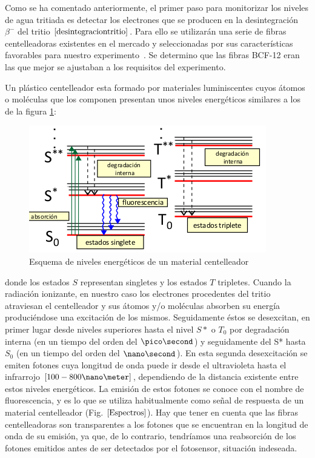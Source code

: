 Como se ha comentado anteriormente, el primer paso para monitorizar los niveles de agua tritiada es detectar los electrones que se producen en la desintegración $\beta^-$ del tritio $\eqref{desintegraciontritio}$. Para ello se utilizarán una serie de fibras centelleadoras existentes en el mercado y seleccionadas por sus características favorables para nuestro experimento~\cite{Alberto}.  Se determino que las fibras BCF-12 eran las que mejor se ajustaban a los requisitos del experimento. 

Un plástico centelleador esta formado por materiales luminiscentes cuyos átomos o moléculas que los componen presentan unos niveles energéticos similares a los de la figura \ref{Esquemafibras}:

\begin{figure}[hbtp]
\centering
\includegraphics[scale=0.7]{EsquemaNivelesFIbras.png}
\caption{Esquema de niveles energéticos de un material centelleador~\cite{asignatura}\label{Esquemafibras}
}
\end{figure}
donde los estados $S$ representan singletes y los estados $T$ tripletes. Cuando la radiación ionizante, en nuestro caso los electrones procedentes del tritio  atraviesan el centelleador  y sus átomos y/o moléculas absorben su energía produciéndose una excitación de los mismos. 
Seguidamente éstos se desexcitan, en primer lugar desde niveles superiores hasta el nivel $S*$ o $T_0$ por degradación interna (en un tiempo del orden del $\pico\second$) y seguidamente del S* hasta $S_0$ (en un tiempo del orden del $\nano\second$). En esta segunda desexcitación se emiten fotones cuya longitud de onda puede ir desde el ultravioleta hasta el infrarrojo $[100-800 \nano\meter]$, dependiendo de la distancia existente entre estos niveles energéticos. La emisión de estos fotones se conoce con el nombre de  fluorescencia, y es lo que se utiliza habitualmente como señal de respuesta de un material centelleador (Fig. $\ref{Espectros}$).
Hay que tener en cuenta que las fibras centelleadoras son transparentes a los fotones que se encuentran en la longitud de onda de su emisión, ya que, de lo contrario, tendríamos una reabsorción de los fotones emitidos antes de ser detectados por el fotosensor, situación indeseada.

